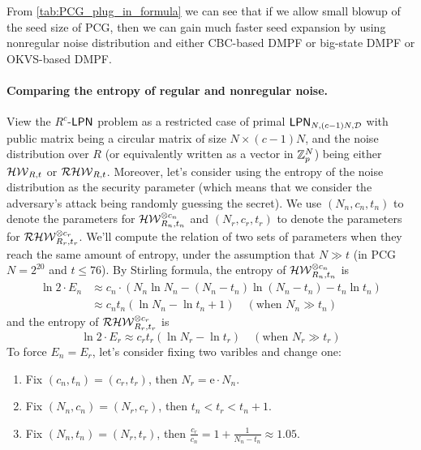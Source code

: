 
From \cref{tab:PCG_plug_in_formula} we can see that if we allow small blowup of the seed size of PCG, then we can gain much faster seed expansion by using nonregular noise distribution and either CBC-based DMPF or big-state DMPF or OKVS-based DMPF. 

\paragraph{Comparing the entropy of regular and nonregular noise.}View the $R^c$-${\sf LPN}$ problem as a restricted case of primal ${\sf LPN}_{N, (c-1)N, \mathcal{D}}$ with public matrix being a circular matrix of size $N\times (c-1)N$, and the noise distribution over $R$ (or equivalently written as a vector in $\mathbb{Z}_p^N$) being either $\mathcal{HW}_{R, t}$ or $\mathcal{RHW}_{R,t}$. Moreover, let's consider using the entropy of the noise distribution as the security parameter (which means that we consider the adversary's attack being randomly guessing the secret). We use $(N_n, c_n, t_n)$ to denote the parameters for $\mathcal{HW}^{\otimes c_n}_{R_n, t_n}$ and $(N_r, c_r, t_r)$ to denote the parameters for $\mathcal{RHW}^{\otimes c_r}_{R_r, t_r}$. We'll compute the relation of two sets of parameters when they reach the same amount of entropy, under the assumption that $N\gg t$ (in PCG $N = 2^{20}$ and $t\le 76$). By Stirling formula, the entropy of $\mathcal{HW}^{\otimes c_n}_{R_n, t_n}$ is 
\[
  \begin{split}
    \ln 2 \cdot E_n &\approx c_n\cdot \left(N_n\ln N_n - (N_n-t_n)\ln(N_n-t_n) - t_n\ln t_n\right) \\&\approx c_n t_n\left(\ln N_n - \ln t_n + 1\right) \quad(\text{when }N_n\gg t_n)
  \end{split}\]
and the entropy of $\mathcal{RHW}^{\otimes c_r}_{R_r, t_r}$ is 
\[
    \ln 2\cdot E_r \approx c_rt_r\left(\ln N_r - \ln t_r\right) \quad(\text{when }N_r\gg t_r)
\]
To force $E_n = E_r$, let's consider fixing two varibles and change one: 
\begin{enumerate}
  \item Fix $(c_n, t_n) = (c_r, t_r)$, then $N_r = \mathrm{e}\cdot N_n$. 
  \item Fix $(N_n, c_n) = (N_r, c_r)$, then $t_n<t_r<t_n+1$. 
  \item Fix $(N_n, t_n) = (N_r, t_r)$, then $\frac{c_r}{c_n} = 1 + \frac{1}{N_n - t_n}\approx 1.05$. 
\end{enumerate}

